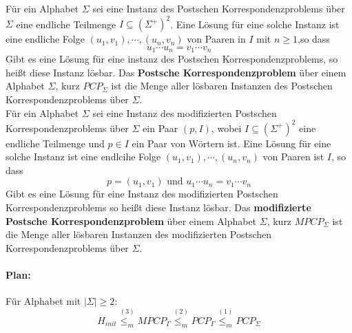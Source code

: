     Für ein Alphabet \(\Sigma\) sei eine Instanz des Postschen Korrespondenzproblems über \(\Sigma\) eine endliche Teilmenge \(I \subseteq (\Sigma^+)^2\). Eine Lösung für eine solche Instanz ist eine endliche Folge \((u_1, v_1), \cdots, (u_n, v_n)\) von Paaren in \(I\) mit \(n \geq 1\),so dass 
    \[
      u_1 \cdots u_n = v_1 \cdots v_n
    \]
    Gibt es eine Lösung für eine instanz des Postschen Korrespondenzproblems, so heißt diese Instanz lösbar. Das \textbf{Postsche Korrespondenzproblem} über einem Alphabet \(\Sigma\), kurz \(PCP_{\Sigma}\) ist die Menge aller lösbaren Instanzen des Postschen Korrespondenzproblems über \(\Sigma\).
    \vspace{0.5cm}\\
    Für ein Alphabet \(\Sigma\) sei eine Instanz des modifizierten Postschen Korrespondenzproblems über \(\Sigma\) ein Paar \((p, I)\), wobei \(I\subseteq (\Sigma^+)^2\) eine endliche Teilmenge und \(p\in I\) ein Paar von Wörtern ist. Eine Lösung für eine solche Instanz ist eine endlcihe Folge \((u_1, v_1), \cdots, (u_n, v_n)\) von Paaren ist \(I\), so dass 
    \[
      p = (u_1, v_1) \text{ und } u_1\cdots u_n = v_1\cdots v_n
    \]
    Gibt es eine Lösung für eine Instanz des modifizierten Postschen Korrespondenzproblems so heißt diese Instanz lösbar. Das \textbf{modifizierte Postsche Korrespondenzproblem} über einem Alphabet \(\Sigma\), kurz \(MPCP_{\Sigma}\) ist die Menge aller lösbaren Instanzen des modifizierten Postschen Korrespondenzproblems über \(\Sigma\).

  \paragraph{Plan: } 
    Für Alphabet mit \(|\Sigma| \geq 2\): 
    \[
      H_{init} \stackrel{(3)}{\leq_m} MPCP_{\Gamma} \stackrel{(2)}{\leq_m} PCP_{\Gamma} \stackrel{(1)}{\leq_m} PCP_{\Sigma}
    \]

